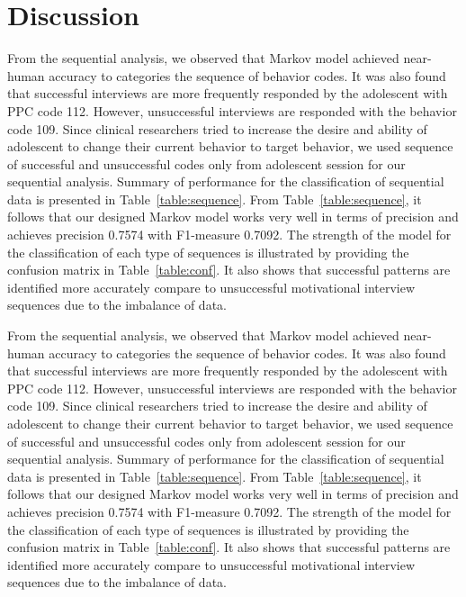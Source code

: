\documentclass{amia}
\begin{document}
\section*{Discussion}
From the sequential analysis, we observed that Markov model achieved near-human accuracy to categories the sequence of behavior codes. It was also found that successful interviews are more frequently responded by the adolescent with PPC code 112. However, unsuccessful interviews are responded with the behavior code 109. Since clinical researchers tried to increase the desire and ability of adolescent to change their current behavior to target behavior, we used sequence of successful and unsuccessful codes only from adolescent session for our sequential analysis. Summary of performance for the classification of sequential data is presented in Table~\ref{table:sequence}. From Table~\ref{table:sequence}, it follows that our designed Markov model works very well in terms of precision and achieves precision 0.7574 with F1-measure 0.7092. The strength of the model for the classification of each type of sequences is illustrated by providing the confusion matrix in Table~\ref{table:conf}. It also shows that successful patterns are identified more accurately compare to unsuccessful motivational interview sequences due to the imbalance of data.

From the sequential analysis, we observed that Markov model achieved near-human accuracy to categories the sequence of behavior codes. It was also found that successful interviews are more frequently responded by the adolescent with PPC code 112. However, unsuccessful interviews are responded with the behavior code 109. Since clinical researchers tried to increase the desire and ability of adolescent to change their current behavior to target behavior, we used sequence of successful and unsuccessful codes only from adolescent session for our sequential analysis. Summary of performance for the classification of sequential data is presented in Table~\ref{table:sequence}. From Table~\ref{table:sequence}, it follows that our designed Markov model works very well in terms of precision and achieves precision 0.7574 with F1-measure 0.7092. The strength of the model for the classification of each type of sequences is illustrated by providing the confusion matrix in Table~\ref{table:conf}. It also shows that successful patterns are identified more accurately compare to unsuccessful motivational interview sequences due to the imbalance of data.
\end{document}
